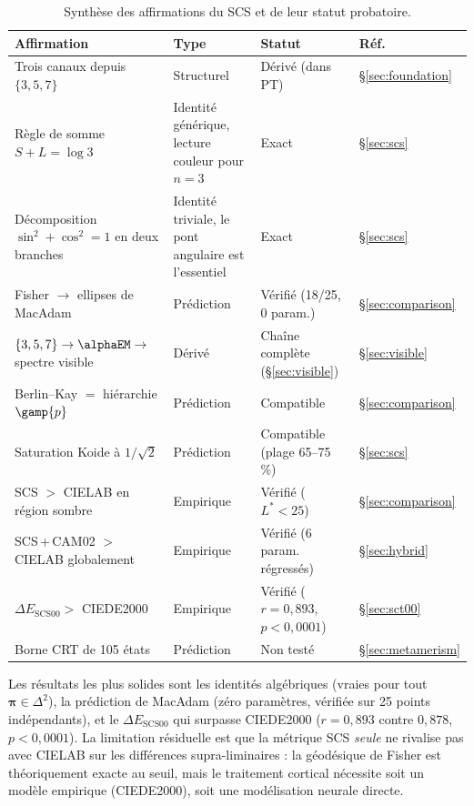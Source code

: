 \documentclass[12pt,a4paper]{article}
\begin{document}
\begin{table}[ht]
\centering
\caption{Synth\`ese des affirmations du SCS et de leur statut probatoire.}
\label{tab:claims}
\begin{tabular}{llll}
\toprule
\textbf{Affirmation} & \textbf{Type} & \textbf{Statut} & \textbf{R\'ef.} \\
\midrule
Trois canaux depuis $\{3,5,7\}$ & Structurel & D\'eriv\'e (dans PT) & \S\ref{sec:foundation} \\
R\`egle de somme $S + L = \log 3$ & Identit\'e g\'en\'erique, lecture couleur pour $n=3$ & Exact & \S\ref{sec:scs} \\
D\'ecomposition $\sin^2 + \cos^2 = 1$ en deux branches & Identit\'e triviale, le pont angulaire est l'essentiel & Exact & \S\ref{sec:scs} \\
Fisher $\to$ ellipses de MacAdam & Pr\'ediction & V\'erifi\'e (18/25, 0 param.) & \S\ref{sec:comparison} \\
$\{3,5,7\} \to \alphaEM \to$ spectre visible & D\'eriv\'e & Cha\^ine compl\`ete (\S\ref{sec:visible}) & \S\ref{sec:visible} \\
Berlin--Kay $=$ hi\'erarchie $\gamp{p}$ & Pr\'ediction & Compatible & \S\ref{sec:comparison} \\
Saturation Koide \`a $1/\sqrt{2}$ & Pr\'ediction & Compatible (plage 65--75\,\%) & \S\ref{sec:scs} \\
SCS $>$ CIELAB en r\'egion sombre & Empirique & V\'erifi\'e ($L^*<25$) & \S\ref{sec:comparison} \\
SCS\,+\,CAM02 $>$ CIELAB globalement & Empirique & V\'erifi\'e (6 param. r\'egress\'es) & \S\ref{sec:hybrid} \\
$\Delta E_{\mathrm{SCS00}} >$ CIEDE2000 & Empirique & V\'erifi\'e ($r=0{,}893$, $p<0{,}0001$) & \S\ref{sec:sct00} \\
Borne CRT de 105 \'etats & Pr\'ediction & Non test\'e & \S\ref{sec:metamerism} \\
\bottomrule
\end{tabular}
\end{table}

Les r\'esultats les plus solides sont les identit\'es alg\'ebriques
(vraies pour tout $\bm{\pi} \in \Delta^2$), la pr\'ediction de
MacAdam (z\'ero param\`etres, v\'erifi\'ee sur 25 points
ind\'ependants), et le $\Delta E_{\mathrm{SCS00}}$ qui surpasse
CIEDE2000 ($r = 0{,}893$ contre $0{,}878$, $p < 0{,}0001$). La
limitation r\'esiduelle est que la m\'etrique SCS \emph{seule} ne
rivalise pas avec CIELAB sur les diff\'erences supra-liminaires :
la g\'eod\'esique de Fisher est th\'eoriquement exacte au seuil, mais
le traitement cortical n\'ecessite soit un mod\`ele empirique
(CIEDE2000), soit une mod\'elisation neurale directe.
\end{document}
